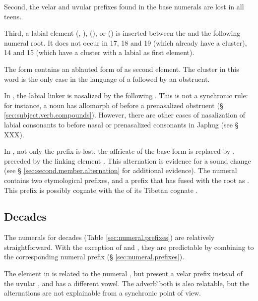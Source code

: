 Second, the velar  and uvular  prefixes found in the base numerals are lost in all teens.

Third, a labial element  (, ),  (), or  () is inserted between the  and the following numeral root. It does not occur in 17, 18 and 19 (which already have a cluster), 14 and 15 (which have a cluster with a labial as first element).

The form  contains an ablauted form of  as second element. The cluster  in this word is the only case in the language of a  followed by an obstruent. 

In , the labial linker is nasalized by the following . This is not a synchronic rule: for instance, a noun  has  allomorph of  before a prenasalized obstruent (§ \ref{sec:subject.verb.compounds}). However, there are other cases of nasalization of labial consonants to  before nasal or prenasalized consonants in Japhug (see § XXX).

In , not only the prefix  is lost, the  affricate of the base form 	 is replaced by , preceded by the linking element . This  \tld{}  alternation is evidence for a sound change  \fl{}  (see § \ref{sec:second.member.alternation} for additional evidence).  The numeral  contains two etymological prefixes,  and a prefix  that has fused with the root as . This  prefix is possibly cognate with the  of its Tibetan cognate   .


\subsection{Decades} \label{sec:decades}
The numerals for decades (Table \ref{sec:numeral.prefixes}) are relatively straightforward. With the exception of  and , they are predictable by combining  to the corresponding numeral prefix (§ \ref{sec:numeral.prefixes}).

The element  in  is related to the numeral  , but present a velar  prefix instead of the uvular , and has a different vowel. The adverb ̌{both} is also relatable, but the alternations are not explainable from a synchronic point of view.

